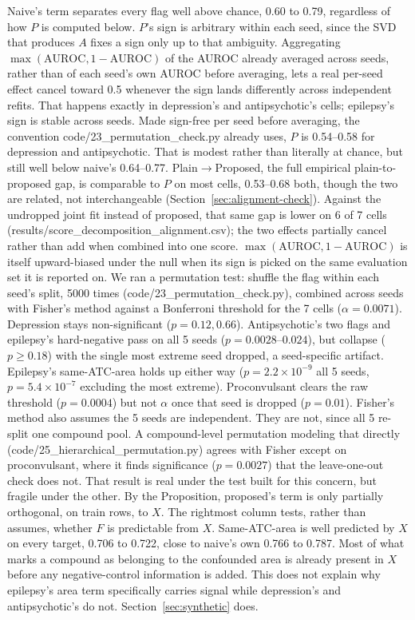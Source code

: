 \documentclass{llncs}
\begin{document}
Naive's term separates every flag well above chance, 0.60 to 0.79, regardless of how $P$ is computed below. $P$'s sign is arbitrary within each seed, since the SVD that produces $A$ fixes a sign only up to that ambiguity. Aggregating $\max(\mathrm{AUROC},1-\mathrm{AUROC})$ of the AUROC already averaged across seeds, rather than of each seed's own AUROC before averaging, lets a real per-seed effect cancel toward 0.5 whenever the sign lands differently across independent refits. That happens exactly in depression's and antipsychotic's cells; epilepsy's sign is stable across seeds. Made sign-free per seed before averaging, the convention code/23\_permutation\_check.py already uses, $P$ is 0.54--0.58 for depression and antipsychotic. That is modest rather than literally at chance, but still well below naive's 0.64--0.77. Plain$\to$Proposed, the full empirical plain-to-proposed gap, is comparable to $P$ on most cells, 0.53--0.68 both, though the two are related, not interchangeable (Section~\ref{sec:alignment-check}). Against the undropped joint fit instead of proposed, that same gap is lower on 6 of 7 cells (results/score\_decomposition\_alignment.csv); the two effects partially cancel rather than add when combined into one score. $\max(\mathrm{AUROC},1-\mathrm{AUROC})$ is itself upward-biased under the null when its sign is picked on the same evaluation set it is reported on. We ran a permutation test: shuffle the flag within each seed's split, 5000 times (code/23\_permutation\_check.py), combined across seeds with Fisher's method against a Bonferroni threshold for the 7 cells ($\alpha=0.0071$). Depression stays non-significant ($p=0.12,0.66$). Antipsychotic's two flags and epilepsy's hard-negative pass on all 5 seeds ($p=0.0028$--$0.024$), but collapse ($p\geq0.18$) with the single most extreme seed dropped, a seed-specific artifact. Epilepsy's same-ATC-area holds up either way ($p=2.2\times10^{-9}$ all 5 seeds, $p=5.4\times10^{-7}$ excluding the most extreme). Proconvulsant clears the raw threshold ($p=0.0004$) but not $\alpha$ once that seed is dropped ($p=0.01$). Fisher's method also assumes the 5 seeds are independent. They are not, since all 5 re-split one compound pool. A compound-level permutation modeling that directly (code/25\_hierarchical\_permutation.py) agrees with Fisher except on proconvulsant, where it finds significance ($p=0.0027$) that the leave-one-out check does not. That result is real under the test built for this concern, but fragile under the other. By the Proposition, proposed's term is only partially orthogonal, on train rows, to $X$. The rightmost column tests, rather than assumes, whether $F$ is predictable from $X$. Same-ATC-area is well predicted by $X$ on every target, 0.706 to 0.722, close to naive's own 0.766 to 0.787. Most of what marks a compound as belonging to the confounded area is already present in $X$ before any negative-control information is added. This does not explain why epilepsy's area term specifically carries signal while depression's and antipsychotic's do not. Section~\ref{sec:synthetic} does.
\end{document}
